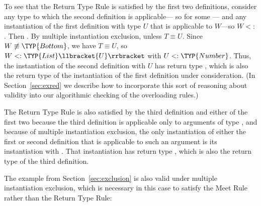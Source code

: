 \documentclass[10pt]{sigplanconf}
\newcommand{\TODO}[1]{\textbf{\emph{\textcolor{red}{TODO}}}: \textsf{\footnotesize #1}}
\newcommand{\subtypeof}{\ensuremath{<:}}
\newcommand{\ob}[1]{\ensuremath{\llbracket {#1} \rrbracket}}
\newcommand{\Bottom}{\TYP{Bottom}}
\begin{document}
To see that the Return Type Rule is satisfied 
by the first two definitions, 
consider any type  
to which the second definition is applicable---%
so  for some ---%
and any instantiation of the first definition with type $U$ 
that is applicable to $W$---so $W \subtypeof$ .
Then 
.
By multiple instantiation exclusion,
unless $T \equiv U$.
Since $W \not\equiv \Bottom$, 
we have $T \equiv U$,
so $W \subtypeof \TYP{List}\ob{U}$ 
with $U \subtypeof \TYP{Number}$.
Thus, the instantiation of the second definition with $U$ 
has return type , 
which is also the return type 
of the instantiation of the first definition 
under consideration.
(In Section~\ref{sec:exred} we describe how to
incorporate this sort of reasoning about validity into our algorithmic
checking of the overloading rules.)

The Return Type Rule is also satisfied by the third definition 
and either of the first two 
because the third definition is applicable 
only to arguments of type ,
and because of multiple instantiation exclusion, 
the only instantiation of either the first or second definition 
that is applicable to such an argument 
is its instantiation with .
That instantiation has return type , 
which is also the return type of the third definition.

The  example from Section~\ref{sec:exclusion} is also valid 
under multiple instantiation exclusion,
which is necessary in this case 
to satisfy the Meet Rule rather than the Return Type Rule:
\end{document}
